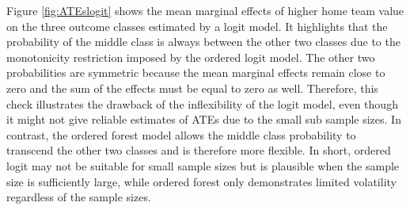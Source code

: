\documentclass[11pt]{article}
\begin{document}
Figure \ref{fig:ATEslogit} shows the mean marginal effects of higher home team value on the three outcome classes estimated by a logit model. It highlights that the probability of the middle class is always between the other two classes due to the monotonicity restriction imposed by the ordered logit model. The other two probabilities are symmetric because the mean marginal effects remain close to zero and the sum of the effects must be equal to zero as well. Therefore, this check illustrates the drawback of the inflexibility of the logit model, even though it might not give reliable estimates of ATEs due to the small sub sample sizes. In contrast, the ordered forest model allows the middle class probability to transcend the other two classes and is therefore more flexible.  In short, ordered logit may not be suitable for small sample sizes but is plausible when the sample size is sufficiently large, while ordered forest only demonstrates limited volatility regardless of the sample sizes.
\end{document}
